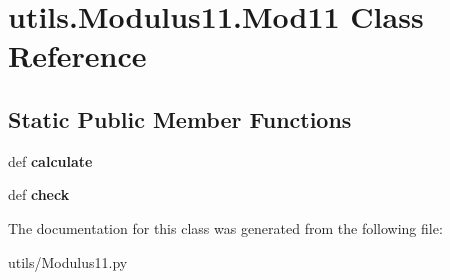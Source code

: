 \hypertarget{classutils_1_1_modulus11_1_1_mod11}{\section{utils.\-Modulus11.\-Mod11 Class Reference}
\label{classutils_1_1_modulus11_1_1_mod11}
}
\subsection*{Static Public Member Functions}
\begin{DoxyCompactItemize}
\item 
\hypertarget{classutils_1_1_modulus11_1_1_mod11_a883c6c7706e04d73af197fa6c23e7e22}{def {\bfseries calculate}}\label{classutils_1_1_modulus11_1_1_mod11_a883c6c7706e04d73af197fa6c23e7e22}

\item 
\hypertarget{classutils_1_1_modulus11_1_1_mod11_afeea820d568b05a3d22dc274cdd32b7f}{def {\bfseries check}}\label{classutils_1_1_modulus11_1_1_mod11_afeea820d568b05a3d22dc274cdd32b7f}

\end{DoxyCompactItemize}


The documentation for this class was generated from the following file\-:\begin{DoxyCompactItemize}
\item 
utils/Modulus11.\-py\end{DoxyCompactItemize}
